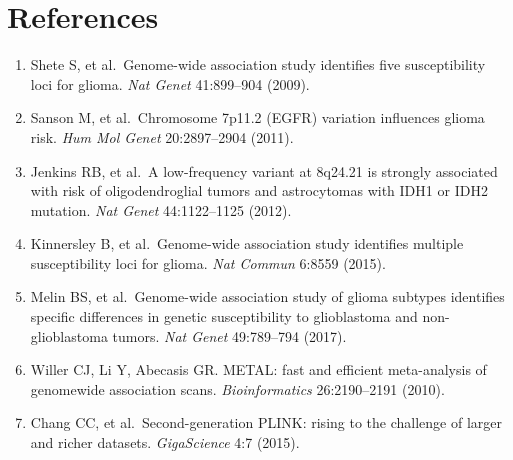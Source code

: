 \documentclass[11pt,letterpaper]{article}
\begin{document}
\section{References}

\begin{enumerate}[nosep]
    \item Shete S, et al.\ Genome-wide association study identifies five susceptibility loci for glioma. \textit{Nat Genet} 41:899--904 (2009).
    \item Sanson M, et al.\ Chromosome 7p11.2 (EGFR) variation influences glioma risk. \textit{Hum Mol Genet} 20:2897--2904 (2011).
    \item Jenkins RB, et al.\ A low-frequency variant at 8q24.21 is strongly associated with risk of oligodendroglial tumors and astrocytomas with IDH1 or IDH2 mutation. \textit{Nat Genet} 44:1122--1125 (2012).
    \item Kinnersley B, et al.\ Genome-wide association study identifies multiple susceptibility loci for glioma. \textit{Nat Commun} 6:8559 (2015).
    \item Melin BS, et al.\ Genome-wide association study of glioma subtypes identifies specific differences in genetic susceptibility to glioblastoma and non-glioblastoma tumors. \textit{Nat Genet} 49:789--794 (2017).
    \item Willer CJ, Li Y, Abecasis GR. METAL: fast and efficient meta-analysis of genomewide association scans. \textit{Bioinformatics} 26:2190--2191 (2010).
    \item Chang CC, et al.\ Second-generation PLINK: rising to the challenge of larger and richer datasets. \textit{GigaScience} 4:7 (2015).
\end{enumerate}
\end{document}
